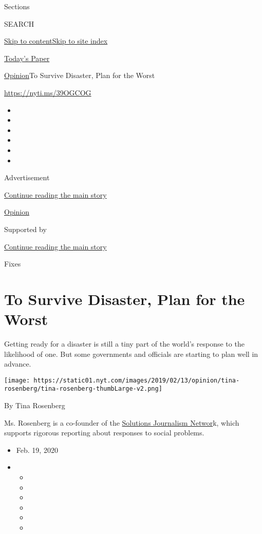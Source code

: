 Sections

SEARCH

\protect\hyperlink{site-content}{Skip to
content}\protect\hyperlink{site-index}{Skip to site index}

\href{https://myaccount.nytimes.com/auth/login?response_type=cookie\&client_id=vi}{}

\href{https://www.nytimes.com/section/todayspaper}{Today's Paper}

\href{/section/opinion}{Opinion}\textbar{}To Survive Disaster, Plan for
the Worst

\href{https://nyti.ms/39OGCOG}{https://nyti.ms/39OGCOG}

\begin{itemize}
\item
\item
\item
\item
\item
\item
\end{itemize}

Advertisement

\protect\hyperlink{after-top}{Continue reading the main story}

\href{/section/opinion}{Opinion}

Supported by

\protect\hyperlink{after-sponsor}{Continue reading the main story}

Fixes

\hypertarget{to-survive-disaster-plan-for-the-worst}{%
\section{To Survive Disaster, Plan for the
Worst}\label{to-survive-disaster-plan-for-the-worst}}

Getting ready for a disaster is still a tiny part of the world's
response to the likelihood of one. But some governments and officials
are starting to plan well in advance.

\texttt{[image: https://static01.nyt.com/images/2019/02/13/opinion/tina-rosenberg/tina-rosenberg-thumbLarge-v2.png]}

By Tina Rosenberg

Ms. Rosenberg is a co-founder of the
\href{http://solutionsjournalism.org}{Solutions Journalism Networ}k,
which supports rigorous reporting about responses to social problems.

\begin{itemize}
\item
  Feb. 19, 2020
\item
  \begin{itemize}
  \item
  \item
  \item
  \item
  \item
  \item
  \end{itemize}
\end{itemize}

